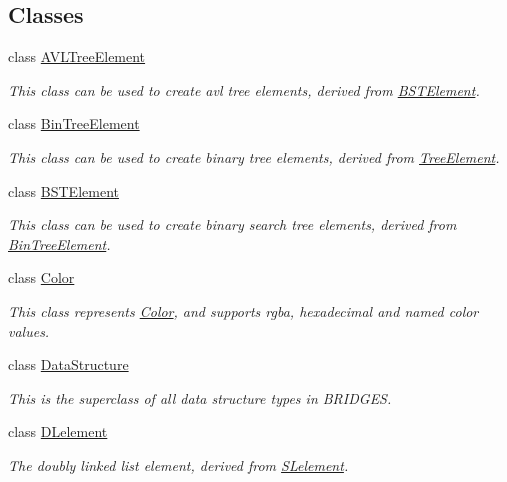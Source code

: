 \subsection*{Classes}
\begin{DoxyCompactItemize}
\item 
class \hyperlink{classbridges_1_1_a_v_l_tree_element}{A\+V\+L\+Tree\+Element}
\begin{DoxyCompactList}\small\item\em This class can be used to create avl tree elements, derived from \hyperlink{classbridges_1_1_b_s_t_element}{B\+S\+T\+Element}. \end{DoxyCompactList}\item 
class \hyperlink{classbridges_1_1_bin_tree_element}{Bin\+Tree\+Element}
\begin{DoxyCompactList}\small\item\em This class can be used to create binary tree elements, derived from \hyperlink{classbridges_1_1_tree_element}{Tree\+Element}. \end{DoxyCompactList}\item 
class \hyperlink{classbridges_1_1_b_s_t_element}{B\+S\+T\+Element}
\begin{DoxyCompactList}\small\item\em This class can be used to create binary search tree elements, derived from \hyperlink{classbridges_1_1_bin_tree_element}{Bin\+Tree\+Element}. \end{DoxyCompactList}\item 
class \hyperlink{classbridges_1_1_color}{Color}
\begin{DoxyCompactList}\small\item\em This class represents \hyperlink{classbridges_1_1_color}{Color}, and supports rgba, hexadecimal and named color values. \end{DoxyCompactList}\item 
class \hyperlink{classbridges_1_1_data_structure}{Data\+Structure}
\begin{DoxyCompactList}\small\item\em This is the superclass of all data structure types in B\+R\+I\+D\+G\+E\+S. \end{DoxyCompactList}\item 
class \hyperlink{classbridges_1_1_d_lelement}{D\+Lelement}
\begin{DoxyCompactList}\small\item\em The doubly linked list element, derived from \hyperlink{classbridges_1_1_s_lelement}{S\+Lelement}. \end{DoxyCompactList}\item 

\end{DoxyCompactItemize}
